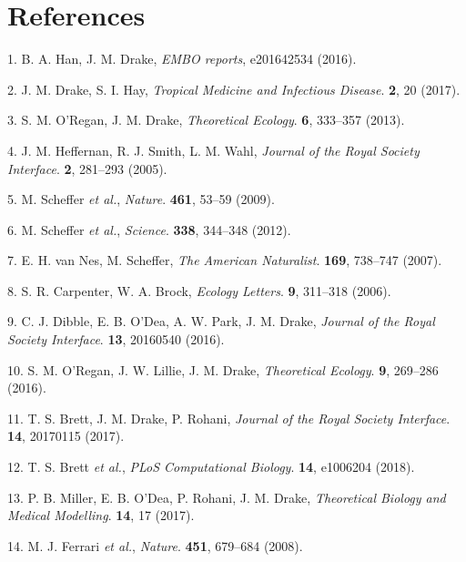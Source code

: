 \documentclass[3p]{elsarticle} %
\begin{document}
\section*{References}\label{references}

\hypertarget{refs}{}
\hypertarget{ref-Han2016}{}
1. B. A. Han, J. M. Drake, \emph{EMBO reports}, e201642534 (2016).

\hypertarget{ref-Drake2017}{}
2. J. M. Drake, S. I. Hay, \emph{Tropical Medicine and Infectious
Disease}. \textbf{2}, 20 (2017).

\hypertarget{ref-ORegan2013}{}
3. S. M. O'Regan, J. M. Drake, \emph{Theoretical Ecology}. \textbf{6},
333--357 (2013).

\hypertarget{ref-Heffernan2005}{}
4. J. M. Heffernan, R. J. Smith, L. M. Wahl, \emph{Journal of the Royal
Society Interface}. \textbf{2}, 281--293 (2005).

\hypertarget{ref-Scheffer2009}{}
5. M. Scheffer \emph{et al.}, \emph{Nature}. \textbf{461}, 53--59
(2009).

\hypertarget{ref-Scheffer2012}{}
6. M. Scheffer \emph{et al.}, \emph{Science}. \textbf{338}, 344--348
(2012).

\hypertarget{ref-VanNes2007}{}
7. E. H. van Nes, M. Scheffer, \emph{The American Naturalist}.
\textbf{169}, 738--747 (2007).

\hypertarget{ref-Carpenter2006}{}
8. S. R. Carpenter, W. A. Brock, \emph{Ecology Letters}. \textbf{9},
311--318 (2006).

\hypertarget{ref-Dibble2016}{}
9. C. J. Dibble, E. B. O'Dea, A. W. Park, J. M. Drake, \emph{Journal of
the Royal Society Interface}. \textbf{13}, 20160540 (2016).

\hypertarget{ref-ORegan2016}{}
10. S. M. O'Regan, J. W. Lillie, J. M. Drake, \emph{Theoretical
Ecology}. \textbf{9}, 269--286 (2016).

\hypertarget{ref-Brett2017}{}
11. T. S. Brett, J. M. Drake, P. Rohani, \emph{Journal of the Royal
Society Interface}. \textbf{14}, 20170115 (2017).

\hypertarget{ref-Brett2018}{}
12. T. S. Brett \emph{et al.}, \emph{PLoS Computational Biology}.
\textbf{14}, e1006204 (2018).

\hypertarget{ref-Miller2017}{}
13. P. B. Miller, E. B. O'Dea, P. Rohani, J. M. Drake, \emph{Theoretical
Biology and Medical Modelling}. \textbf{14}, 17 (2017).

\hypertarget{ref-Ferrari2008}{}
14. M. J. Ferrari \emph{et al.}, \emph{Nature}. \textbf{451}, 679--684
(2008).
\end{document}
